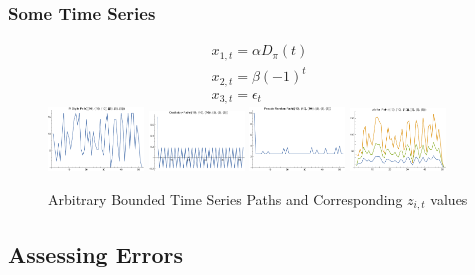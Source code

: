 \documentclass[notheorems]{beamer}
\begin{document}
\begin{frame}
  \frametitle{Some Time Series}


\begin{figure}
  \centering
\begin{gather}
  x_{1,t}=\alpha D_\pi(t) \\
x_{2,t}=\beta (-1)^t\\
x_{3,t}=\epsilon_t 
\end{gather} 
\includegraphics[width=1in]{piPath.pdf}
\includegraphics[width=1in]{oscillPath.pdf}
\includegraphics[width=1in]{pseudoPath.pdf}
\includegraphics[width=1in]{theZs.pdf}  
  
  \caption{Arbitrary Bounded Time Series Paths and Corresponding $z_{i,t}$ values}\label{arbpaths}
\end{figure}



\end{frame}

\subsection{Assessing Errors}
\label{sec:assessing-errors}
\end{document}
